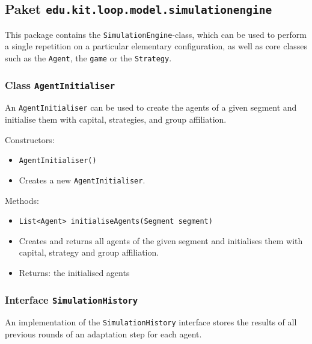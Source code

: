 \documentclass[parskip=full,11pt]{scrartcl}
\begin{document}
\subsection{Paket \texttt{edu.kit.loop.model.simulationengine}}

This package contains the \texttt{SimulationEngine}-class, which can be used to perform a single repetition on a particular elementary configuration, as well as core classes such as the \texttt{Agent}, the \texttt{game} or the \texttt{Strategy}.

\subsubsection{Class \texttt{AgentInitialiser}}
An \texttt{AgentInitialiser} can be used to create the agents of a given segment and initialise them with capital, strategies, and group affiliation.

Constructors:
\begin{itemize}\itemsep -10pt
\item \texttt{AgentInitialiser()}
\item[] Creates a new \texttt{AgentInitialiser}.
\end{itemize}

Methods:
\begin{itemize}\itemsep -10pt
\item \texttt{List<Agent> initialiseAgents(Segment segment)}
\item[] Creates and returns all agents of the given segment and initialises them with capital, strategy and group affiliation.
\item[] Returns: the initialised agents
\end{itemize}

\subsubsection{Interface \texttt{SimulationHistory}}
An implementation of the \texttt{SimulationHistory} interface stores the results of all previous rounds of an adaptation step for each agent.
\end{document}
